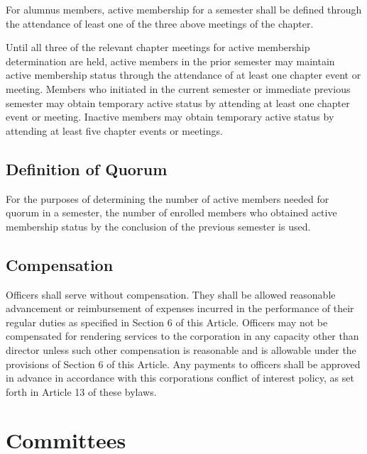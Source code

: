 \documentclass{article}
\begin{document}
	For alumnus members, active membership for a semester shall be defined through the attendance of least one of the three above meetings of the chapter.
	
	Until all three of the relevant chapter meetings for active membership determination are held, active members in the prior semester may maintain active membership status through the attendance of at least one chapter event or meeting. Members who initiated in the current semester or immediate previous semester may obtain temporary active status by attending at least one chapter event or meeting. Inactive members may obtain temporary active status by attending at least five chapter events or meetings.
	
	\subsection{Definition of Quorum}
	For the purposes of determining the number of active members needed for quorum in a semester, the number of enrolled members who obtained active membership status by the conclusion of the previous semester is used. %
	\subsection{Compensation}
	Officers shall serve without compensation. They shall be allowed reasonable advancement or reimbursement of expenses incurred in the performance of their regular duties as specified in Section 6 of this Article. Officers may not be compensated for rendering services to the corporation in any capacity other than director unless such other compensation is reasonable and is allowable under the provisions of Section 6 of this Article. Any payments to officers shall be approved in advance in accordance with this corporation\textquotesingle s conflict of interest policy, as set forth in Article 13 of these bylaws.
	
	\section{Committees}
\end{document}
